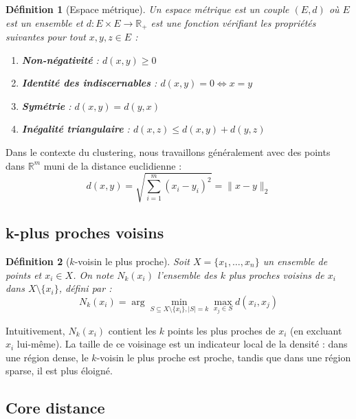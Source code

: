\documentclass[11pt,a4paper]{article}
\newtheorem{definition}{Définition}[section]
\begin{document}
\begin{definition}[Espace métrique]
Un espace métrique est un couple $(E, d)$ où $E$ est un ensemble et $d : E \times E \to \mathbb{R}_+$ est une fonction vérifiant les propriétés suivantes pour tout $x, y, z \in E$ :
\begin{enumerate}
    \item \textbf{Non-négativité} : $d(x, y) \geq 0$
    \item \textbf{Identité des indiscernables} : $d(x, y) = 0 \Leftrightarrow x = y$
    \item \textbf{Symétrie} : $d(x, y) = d(y, x)$
    \item \textbf{Inégalité triangulaire} : $d(x, z) \leq d(x, y) + d(y, z)$
\end{enumerate}
\end{definition}

Dans le contexte du clustering, nous travaillons généralement avec des points dans $\mathbb{R}^m$ muni de la distance euclidienne :
\begin{equation}
d(x, y) = \sqrt{\sum_{i=1}^{m} (x_i - y_i)^2} = \|x - y\|_2
\end{equation}

\subsection{k-plus proches voisins}

\begin{definition}[$k$-voisin le plus proche]
Soit $X = \{x_1, \ldots, x_n\}$ un ensemble de points et $x_i \in X$. On note $N_k(x_i)$ l'ensemble des $k$ plus proches voisins de $x_i$ dans $X \setminus \{x_i\}$, défini par :
\begin{equation}
N_k(x_i) = \arg\min_{S \subseteq X \setminus \{x_i\}, |S| = k} \max_{x_j \in S} d(x_i, x_j)
\end{equation}
\end{definition}

Intuitivement, $N_k(x_i)$ contient les $k$ points les plus proches de $x_i$ (en excluant $x_i$ lui-même). La taille de ce voisinage est un indicateur local de la densité : dans une région dense, le $k$-voisin le plus proche est proche, tandis que dans une région sparse, il est plus éloigné.

\subsection{Core distance}
\end{document}
